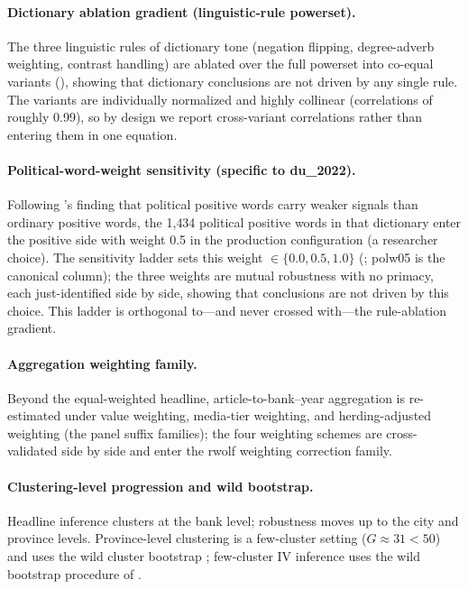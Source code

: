 \paragraph{Dictionary ablation gradient (linguistic-rule powerset).}
The three linguistic rules of dictionary tone (negation flipping,
degree-adverb weighting, contrast handling) are ablated over the full
powerset into co-equal variants
(),
showing that dictionary conclusions are not driven by any single rule.
The variants are individually normalized and highly collinear
(correlations of roughly 0.99), so by design we report cross-variant
correlations rather than entering them in one equation.

\paragraph{Political-word-weight sensitivity (specific to
du\_2022).}
Following \textcite{du2022dictionary}'s finding that political
positive words carry weaker signals than ordinary positive words, the
1{,}434 political positive words in that dictionary enter the positive
side with weight 0.5 in the production configuration (a researcher
choice). The sensitivity ladder sets this weight
$\in \{0.0, 0.5, 1.0\}$
(; polw05 is the canonical
column); the three weights are mutual robustness with no primacy,
each just-identified side by side, showing that conclusions are not
driven by this choice. This ladder is orthogonal to---and never
crossed with---the rule-ablation gradient.

\paragraph{Aggregation weighting family.}
Beyond the equal-weighted headline, article-to-bank--year aggregation
is re-estimated under value weighting, media-tier weighting, and
herding-adjusted weighting (the panel  suffix
families); the four weighting schemes are cross-validated side by side
and enter the rwolf weighting correction family.

\paragraph{Clustering-level progression and wild bootstrap.}
Headline inference clusters at the bank level; robustness moves up to
the city and province levels. Province-level clustering is a
few-cluster setting ($G \approx 31 < 50$) and uses the wild cluster
bootstrap \parencite{mackinnon2017wild}; few-cluster IV inference uses
the wild bootstrap procedure of \textcite{wang2024wildiv}.

